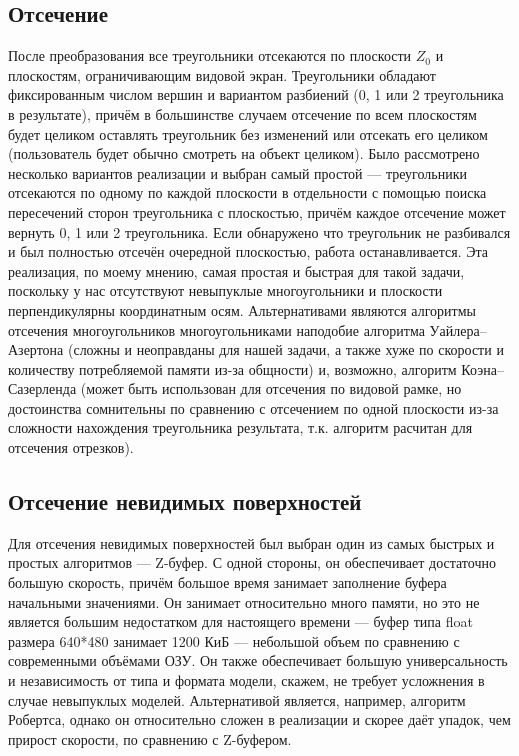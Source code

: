 \documentclass[a4paper,12pt]{report}
\begin{document}
\subsection{Отсечение}
После преобразования все треугольники отсекаются по плоскости $Z_0$ и плоскостям, ограничивающим видовой экран. Треугольники обладают фиксированным числом вершин и вариантом разбиений (0, 1 или 2 треугольника в результате), причём в большинстве случаем отсечение по всем плоскостям будет целиком оставлять треугольник без изменений или отсекать его целиком (пользователь будет обычно смотреть на объект целиком). Было рассмотрено несколько вариантов реализации и выбран самый простой --- треугольники отсекаются по одному по каждой плоскости в отдельности с помощью поиска пересечений сторон треугольника с плоскостью, причём каждое отсечение может вернуть 0, 1 или 2 треугольника. Если обнаружено что треугольник не разбивался и был полностью отсечён очередной плоскостью, работа останавливается. Эта реализация, по моему мнению, самая простая и быстрая для такой задачи, поскольку у нас отсутствуют невыпуклые многоугольники и плоскости перпендикулярны координатным осям. Альтернативами являются алгоритмы отсечения многоугольников многоугольниками наподобие алгоритма Уайлера--Азертона (сложны и неоправданы для нашей задачи, а также хуже по скорости и количеству потребляемой памяти из-за общности) и, возможно, алгоритм Коэна--Сазерленда (может быть использован для отсечения по видовой рамке, но достоинства сомнительны по сравнению с отсечением по одной плоскости из-за сложности нахождения треугольника результата, т.к. алгоритм расчитан для отсечения отрезков).

\subsection{Отсечение невидимых поверхностей}
Для отсечения невидимых поверхностей был выбран один из самых быстрых и простых алгоритмов --- Z-буфер. С одной стороны, он обеспечивает достаточно большую скорость, причём большое время занимает заполнение буфера начальными значениями. Он занимает относительно много памяти, но это не является большим недостатком для настоящего времени --- буфер типа float размера 640*480 занимает 1200 КиБ --- небольшой объем по сравнению с современными объёмами ОЗУ. Он также обеспечивает большую универсальность и независимость от типа и формата модели, скажем, не требует усложнения в случае невыпуклых моделей. Альтернативой является, например, алгоритм Робертса, однако он относительно сложен в реализации и скорее даёт упадок, чем прирост скорости, по сравнению с Z-буфером.
\end{document}
